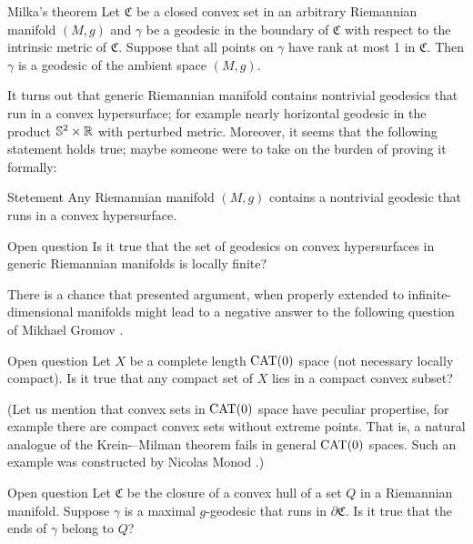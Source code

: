 \documentclass[a4paper,10pt]{article}
\begin{document}
\begin{thm}{Milka's theorem}
Let $\mathfrak{C}$ be a closed convex set in an arbitrary Riemannian manifold $(M,g)$ and $\gamma$ be a geodesic in the boundary of $\mathfrak{C}$ with respect to the intrinsic metric of $\mathfrak {C}$.
Suppose that all points on $\gamma$ have rank at most 1 in $\mathfrak{C}$.
Then $\gamma$ is a geodesic of the ambient space $(M,g)$.
\end{thm}

It turns out that generic Riemannian manifold contains nontrivial geodesics that run in a convex hypersurface;
for example nearly horizontal geodesic in the product $\mathbb{S}^2\times \mathbb{R}$ with perturbed metric. 
Moreover, it seems that the following statement holds true; maybe someone were to take on the burden of proving it formally:

\begin{thm}{Stetement}
Any Riemannian manifold $(M,g)$ contains a nontrivial geodesic  that runs in a convex hypersurface.
\end{thm}


\begin{thm}{Open question}
Is it true that the set of geodesics on convex hypersurfaces in generic Riemannian manifolds is locally finite?
\end{thm}

There is a chance that presented argument, when properly extended to infinite-dimensional manifolds might lead to a negative answer to the following question of Mikhael Gromov \cite[6.B\textsubscript{1}(f)]{gromov-1993}.

\begin{thm}{Open question}
Let $X$ be a complete length $\operatorname{\rm CAT}(0)$ space (not necessary locally compact).
Is it true that any compact set of $X$ lies in a compact convex subset?
\end{thm}

(Let us mention that convex sets in $\operatorname{\rm CAT}(0)$ space have peculiar propertise, for example there are compact convex sets without extreme points.
That is, a  natural  analogue  of  the  Krein-–Milman  theorem fails in general $\operatorname{\rm CAT}(0)$ spaces.
Such an example was constructed by Nicolas Monod \cite{monod-2016}.)

\begin{thm}{Open question}
Let $\mathfrak{C}$ be the closure of a convex hull of a set $Q$ in a Riemannian manifold.
Suppose $\gamma$ is a maximal $g$-geodesic that runs in $\partial \mathfrak{C}$.
Is it true that the ends of $\gamma$ belong to $Q$?
\end{thm}




\end{document}
